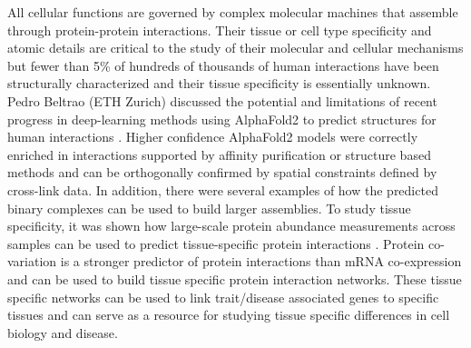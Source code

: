 All cellular functions are governed by complex molecular machines that assemble through protein-protein interactions. Their tissue or cell type specificity and atomic details are critical to the study of their molecular and cellular mechanisms but fewer than 5\% of hundreds of thousands of human interactions have been structurally characterized \citep{pmid23399932} and their tissue specificity is essentially unknown. Pedro Beltrao (ETH Zurich) discussed the potential and limitations of recent progress in deep-learning methods using AlphaFold2 to predict structures for human interactions \citep{pmid36690744}. Higher confidence AlphaFold2 models were correctly enriched in interactions supported by affinity purification or structure based methods and can be orthogonally confirmed by spatial constraints defined by cross-link data. In addition, there were several examples of how the predicted binary complexes can be used to build larger assemblies. To study tissue specificity, it was shown how large-scale protein abundance measurements across samples can be used to predict tissue-specific protein interactions \citep{pmid29032074, pmid28854368}. Protein co-variation is a stronger predictor of protein interactions than mRNA co-expression and can be used to build tissue specific protein interaction networks. These tissue specific networks can be used to link trait/disease associated genes to specific tissues and can serve as a resource for studying tissue specific differences in cell biology and disease.


